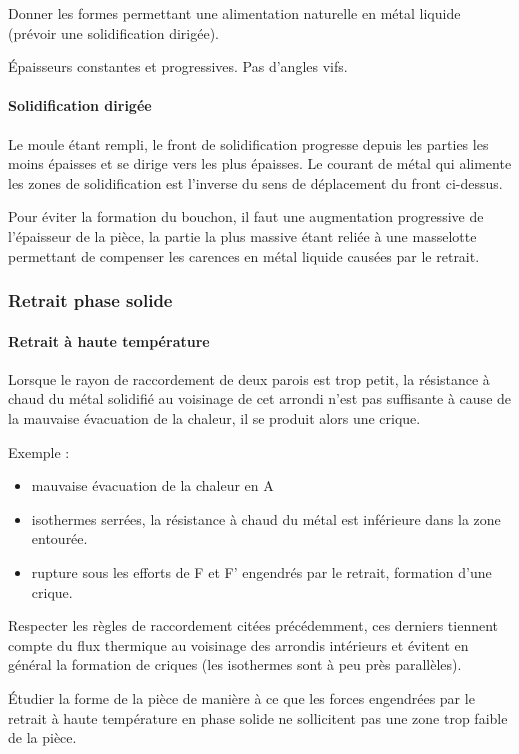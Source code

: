 \documentclass[11pt,oneside]{article}
\begin{document}
Donner les formes permettant une alimentation naturelle en métal liquide
(prévoir une solidification dirigée). 

Épaisseurs constantes et progressives. Pas d'angles vifs.

\paragraph*{Solidification dirigée}
Le moule étant rempli, le front de solidification progresse depuis les parties
les moins épaisses et se dirige vers les plus épaisses. Le courant de métal qui
alimente les zones de solidification est l'inverse du sens de déplacement du
front ci-dessus.

Pour éviter la formation du bouchon, il faut une augmentation progressive de
l'épaisseur de la pièce, la partie la plus massive étant reliée à une
masselotte permettant de compenser les carences en métal liquide causées par le
retrait.



\subsubsection{Retrait phase solide}
\paragraph*{Retrait à haute température}
Lorsque le rayon de raccordement de deux parois est trop petit, la résistance à
chaud du métal solidifié au voisinage de cet arrondi n'est pas suffisante à
cause de la mauvaise évacuation de la chaleur, il se produit alors une crique. 

Exemple : 
\begin{itemize}
 \item mauvaise évacuation de la chaleur en A
\item isothermes serrées, la résistance à chaud du métal est inférieure dans la
zone entourée. 
\item rupture sous les efforts de F et F' engendrés par le retrait, formation
d'une crique.
\end{itemize}

Respecter les règles de raccordement citées précédemment, ces derniers tiennent
compte du flux thermique au voisinage des arrondis intérieurs et évitent en
général la formation de criques (les isothermes sont à peu près parallèles).


Étudier la forme de la pièce de manière à ce que les forces engendrées par le
retrait à haute température en phase solide ne sollicitent pas une zone trop
faible de la pièce.
\end{document}
